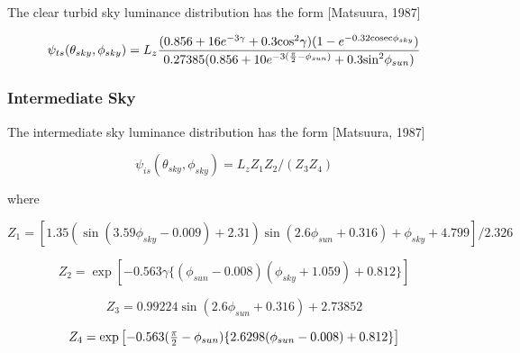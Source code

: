 The clear turbid sky luminance distribution has the form {[}Matsuura, 1987{]}

\begin{equation}
{\psi_{ts}}({\theta_{sky}},{\phi_{sky}}) = {L_z}\frac{{(0.856 + 16{e^{ - 3\gamma }} + 0.3{{\cos }^2}\gamma )(1 - {e^{ - 0.32{\rm{cosec}}{\phi_{sky}}}})}}{{0.27385(0.856 + 10{e^{ - 3(\frac{\pi }{2} - {\phi_{sun}})}} + 0.3{{\sin }^2}{\phi_{sun}})}}
\end{equation}

\subsubsection{Intermediate Sky}\label{intermediate-sky}

The intermediate sky luminance distribution has the form {[}Matsuura, 1987{]}

\begin{equation}
{\psi_{is}}\left( {{\theta_{sky}},{\phi_{sky}}} \right) = {L_z}{Z_1}{Z_2}/({Z_3}{Z_4})
\end{equation}

where

\begin{equation}
{Z_1} = \left[ {1.35(\sin (3.59{\phi_{sky}} - 0.009) + 2.31)\sin (2.6{\phi_{sun}} + 0.316) + {\phi_{sky}} + 4.799} \right]/2.326 
\end{equation}

\begin{equation}
{Z_2} = \exp \left[ { - 0.563\gamma \{ ({\phi_{sun}} - 0.008)({\phi_{sky}} + 1.059) + 0.812\} } \right]
\end{equation}

\begin{equation}
{Z_3} = 0.99224\sin (2.6{\phi_{sun}} + 0.316) + 2.73852
\end{equation}

\begin{equation}
{Z_4} = \exp \left[ { - 0.563({\textstyle{\pi  \over 2}} - {\phi_{sun}})\{ 2.6298({\phi_{sun}} - 0.008) + 0.812\} } \right]
\end{equation}

